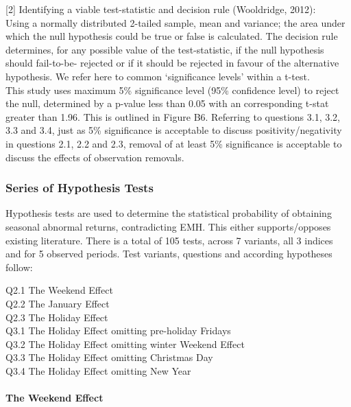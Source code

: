 \documentclass[11pt, english]{article}
\begin{document}
		[2] Identifying a viable test-statistic and decision rule (Wooldridge, 2012):\\

		Using a normally distributed 2-tailed sample, mean and variance; the area under which the null hypothesis could be true or false is calculated. The decision rule determines, for any possible value of the test-statistic, if the null hypothesis should fail-to-be- rejected or if it should be rejected in favour of the alternative hypothesis. We refer here to common `significance levels' within a t-test.\\

		This study uses maximum 5\% significance level (95\% confidence level) to reject the null, determined by a p-value less than 0.05 with an corresponding t-stat greater than 1.96. This is outlined in Figure B6. Referring to questions 3.1, 3.2, 3.3 and 3.4, just as 5\% significance is acceptable to discuss positivity/negativity in questions 2.1, 2.2 and 2.3, removal of at least 5\% significance is acceptable to discuss the effects of observation removals.

		\subsubsection{Series of Hypothesis Tests}

		Hypothesis tests are used to determine the statistical probability of obtaining seasonal abnormal returns, contradicting EMH. This either supports/opposes existing literature. There is a total of 105 tests, across 7 variants, all 3 indices and for 5 observed periods. Test variants, questions and according hypotheses follow:

	\newpage

		Q2.1 The Weekend Effect\\ Q2.2 The January Effect\\ Q2.3 The Holiday Effect\\ Q3.1 The Holiday Effect omitting pre-holiday Fridays\\ Q3.2 The Holiday Effect omitting winter Weekend Effect\\ Q3.3 The Holiday Effect omitting Christmas Day\\ Q3.4 The Holiday Effect omitting New Year

			\paragraph{The Weekend Effect}
\end{document}
